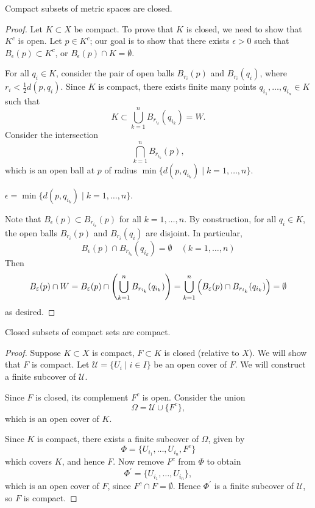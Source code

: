 \begin{proposition}\label{prop:compact-closed}
Compact subsets of metric spaces are closed.
\end{proposition}

\begin{proof}
Let $K\subset X$ be compact. To prove that $K$ is closed, we need to show that $K^c$ is open. Let $p\in K^c$; our goal is to show that there exists $\epsilon>0$ such that $B_\epsilon(p)\subset K^c$, or $B_\epsilon(p)\cap K=\emptyset$.

For all $q_i\in K$, consider the pair of open balls $B_{r_i}(p)$ and $B_{r_i}(q_i)$, where $r_i<\frac{1}{2}d(p,q_i)$. Since $K$ is compact, there exists finite many points $q_{i_1},\dots,q_{i_n}\in K$ such that
\[K\subset\bigcup_{k=1}^{n}B_{r_{i_k}}(q_{i_k})=W.\]
Consider the intersection
\[\bigcap_{k=1}^{n}B_{r_{i_k}}(p),\]
which is an open ball at $p$ of radius $\min\{d(p,q_{i_k})\mid k=1,\dots,n\}$. 
\begin{claim}
$\epsilon=\min\{d(p,q_{i_k})\mid k=1,\dots,n\}$.
\end{claim}
Note that $B_\epsilon(p)\subset B_{r_{i_k}}(p)$ for all $k=1,\dots,n$. By construction, for all $q_i\in K$, the open balls $B_{r_i}(p)$ and $B_{r_i}(q_i)$ are disjoint. In particular,
\[B_\epsilon(p)\cap B_{r_{i_k}}(q_{i_k})=\emptyset\quad(k=1,\dots,n)\]
Then
\[B_\varepsilon(p)\cap W=B_\varepsilon(p)\cap\left(\bigcup_{k=1}^{n}B_{r_{i_k}}(q_{i_k})\right)=\bigcup_{k=1}^{n}\left(B_\varepsilon(p)\cap B_{r_{i_k}}(q_{i_k})\right)=\emptyset\]
as desired.
\end{proof}

\begin{proposition}\label{prop:closed-compact}
Closed subsets of compact sets are compact.
\end{proposition}

\begin{proof}
Suppose $K\subset X$ is compact, $F\subset K$ is closed (relative to $X$). We will show that $F$ is compact. Let $\mathcal{U}=\{U_i\mid i\in I\}$ be an open cover of $F$. We will construct a finite subcover of $\mathcal{U}$.

Since $F$ is closed, its complement $F^c$ is open. Consider the union
\[\Omega=\mathcal{U}\cup\{F^c\},\]
which is an open cover of $K$.

Since $K$ is compact, there exists a finite subcover of $\Omega$, given by
\[\Phi=\{U_{i_1},\dots,U_{i_n},F^c\}\]
which covers $K$, and hence $F$. Now remove $F^c$ from $\Phi$ to obtain
\[\Phi^\prime=\{U_{i_1},\dots,U_{i_n}\},\]
which is an open cover of $F$, since $F^c\cap F=\emptyset$. Hence $\Phi^\prime$ is a finite subcover of $\mathcal{U}$, so $F$ is compact.
\end{proof}


